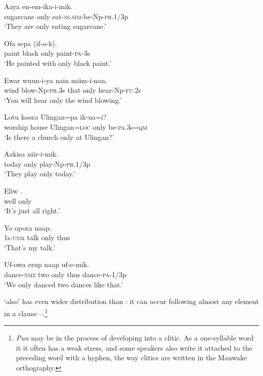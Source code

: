\ea%
\label{ex:3:x747}
\gll Aaya  en-em-ika-i-mik. \\
sugarcane only eat-\textsc{ss}.\textsc{sim}-be-Np-\textsc{pr}.1/3p\\
\glt`They are only eating sugarcane.' 
\z

\ea%
\label{ex:3:x748}
\gll Ofa sepa   (if-o-k). \\
paint black only paint-\textsc{pa}-3s\\
\glt`He painted with only black paint.'
\z

\ea%
\label{ex:3:x757}
\gll Ewar wuun-i-ya nain  miim-i-nan. \\
wind blow-Np-\textsc{pr}.3s that only hear-Np-\textsc{fu}.2s\\
\glt`You will hear only the wind blowing.'
\z

\ea%
\label{ex:3:x758}
\gll Lotu koora Ulingan=pa  ik-ua=i? \\
worship house Ulingan=\textsc{loc} only be-\textsc{pa}.3s=\textsc{qm}\\
\glt`Is there a church only at Ulingan?'
\z

\ea%
\label{ex:3:x806}
\gll Aakisa  niir-i-mik. \\
today only play-Np-\textsc{pr}.1/3p\\
\glt`They play only today.'
\z

\ea%
\label{ex:3:x807}
\gll Eliw . \\
well only\\
\glt`It's just all right.'
\z

\ea%
\label{ex:3:x1820}
\gll Yo opora  naap. \\
1s.\textsc{unm} talk only thus\\
\glt`That's my talk.'
\z

\ea%
\label{ex:3:x1821}
\gll Uf-owa erup  naap uf-e-mik. \\
dance-\textsc{nmz} two only thus dance-\textsc{pa}-1/3p\\
\glt`We only danced two dances like that.'
\z

 `also' has even wider distribution than : it can occur following almost any element in a clause --.\footnote{\textit{Pun} may be in the process of developing into a clitic. As a one-syllable word it it often has a weak stress, and some speakers also write it attached to the preceding word with a hyphen, the way clitics are written in the Mauwake orthography.} 

